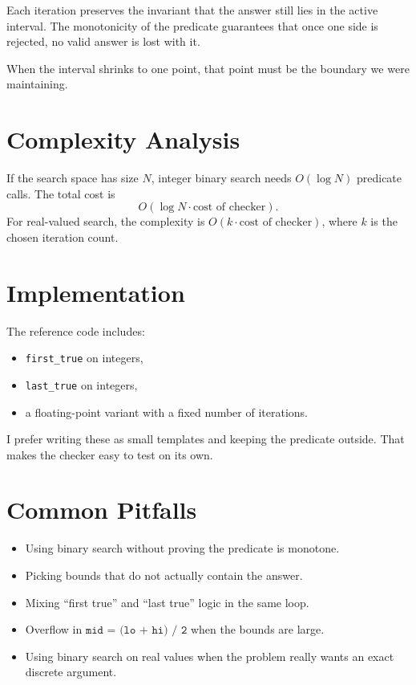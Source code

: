 Each iteration preserves the invariant that the answer still lies in the active interval. The monotonicity of the
predicate guarantees that once one side is rejected, no valid answer is lost with it.

When the interval shrinks to one point, that point must be the boundary we were maintaining.

\section*{Complexity Analysis}

If the search space has size \(N\), integer binary search needs \(O(\log N)\) predicate calls. The total cost is
\[
O(\log N \cdot \text{cost of checker}).
\]
For real-valued search, the complexity is \(O(k \cdot \text{cost of checker})\), where \(k\) is the chosen iteration
count.

\section*{Implementation}

The reference code includes:

\begin{itemize}
  \item \texttt{first\_true} on integers,
  \item \texttt{last\_true} on integers,
  \item a floating-point variant with a fixed number of iterations.
\end{itemize}

I prefer writing these as small templates and keeping the predicate outside. That makes the checker easy to test on
its own.

\section*{Common Pitfalls}

\begin{itemize}
  \item Using binary search without proving the predicate is monotone.
  \item Picking bounds that do not actually contain the answer.
  \item Mixing ``first true'' and ``last true'' logic in the same loop.
  \item Overflow in \(\texttt{mid = (lo + hi) / 2}\) when the bounds are large.
  \item Using binary search on real values when the problem really wants an exact discrete argument.
\end{itemize}

